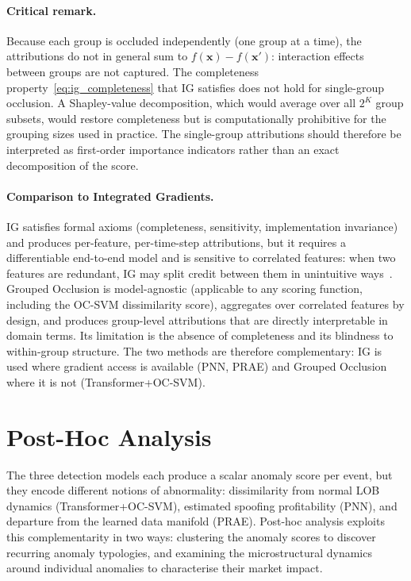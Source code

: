 \documentclass[11pt]{report}
\begin{document}
\paragraph{Critical remark.}
Because each group is occluded independently (one group at a time), the attributions do not in general sum to $f(\mathbf{x}) - f(\mathbf{x}')$: interaction effects between groups are not captured. The completeness property~\eqref{eq:ig_completeness} that IG satisfies does not hold for single-group occlusion. A Shapley-value decomposition, which would average over all $2^K$ group subsets, would restore completeness but is computationally prohibitive for the grouping sizes used in practice. The single-group attributions should therefore be interpreted as first-order importance indicators rather than an exact decomposition of the score.

\paragraph{Comparison to Integrated Gradients.}
IG satisfies formal axioms (completeness, sensitivity, implementation invariance) and produces per-feature, per-time-step attributions, but it requires a differentiable end-to-end model and is sensitive to correlated features: when two features are redundant, IG may split credit between them in unintuitive ways~\cite{sundararajan2017axiomaticattributiondeepnetworks}. Grouped Occlusion is model-agnostic (applicable to any scoring function, including the OC-SVM dissimilarity score), aggregates over correlated features by design, and produces group-level attributions that are directly interpretable in domain terms. Its limitation is the absence of completeness and its blindness to within-group structure. The two methods are therefore complementary: IG is used where gradient access is available (PNN, PRAE) and Grouped Occlusion where it is not (Transformer+OC-SVM).

\section{Post-Hoc Analysis}\label{sec:methodology:posthoc}

The three detection models each produce a scalar anomaly score per event, but they encode different notions of abnormality: dissimilarity from normal LOB dynamics (Transformer+OC-SVM), estimated spoofing profitability (PNN), and departure from the learned data manifold (PRAE). Post-hoc analysis exploits this complementarity in two ways: clustering the anomaly scores to discover recurring anomaly typologies, and examining the microstructural dynamics around individual anomalies to characterise their market impact.
\end{document}
